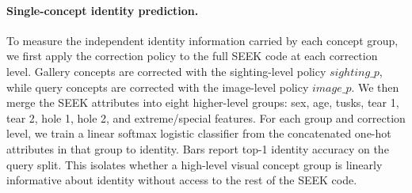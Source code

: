 \paragraph{Single-concept identity prediction.}
To measure the independent identity information carried by each concept group, we first apply the correction policy to the full SEEK code at each correction level. Gallery concepts are corrected with the sighting-level policy \(sighting\_p\), while query concepts are corrected with the image-level policy \(image\_p\). We then merge the SEEK attributes into eight higher-level groups: sex, age, tusks, tear 1, tear 2, hole 1, hole 2, and extreme/special features. For each group and correction level, we train a linear softmax logistic classifier from the concatenated one-hot attributes in that group to identity. Bars report top-1 identity accuracy on the query split. This isolates whether a high-level visual concept group is linearly informative about identity without access to the rest of the SEEK code.
